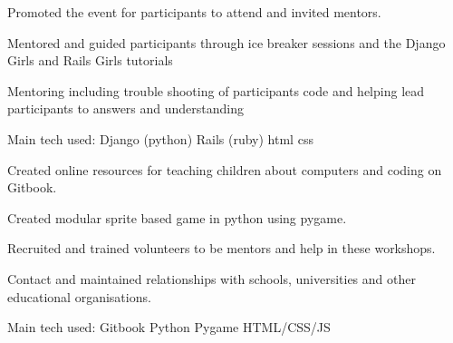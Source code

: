 \documentclass[a4paper]{deedy-resume_twopage} %
\begin{document}
\begin{minipage}[t]{0.66\textwidth}
  \sectionspace %



  \vspace{\topsep} %
  \begin{tightitemize}
  \item Promoted the event for participants to attend and invited mentors.
  \item Mentored and guided participants through ice breaker sessions and the Django Girls and Rails Girls tutorials
  \item Mentoring including trouble shooting of participants code and helping lead participants to answers and understanding
  \end{tightitemize}
  Main tech used: \textbullet{} Django (python) \textbullet{} Rails (ruby) \textbullet{} html \textbullet{} css

  \sectionspace %



  \begin{tightitemize}
  \item Created online resources for teaching children about computers and coding on Gitbook.
  \item Created modular sprite based game in python using pygame. %
  \item Recruited and trained volunteers to be mentors and help in these workshops.
  \item Contact and maintained relationships with schools, universities and other educational organisations.
  \end{tightitemize}
  Main tech used: \textbullet{} Gitbook \textbullet{} Python \textbullet{} Pygame \textbullet{} HTML/CSS/JS


\end{minipage}
\end{document}
